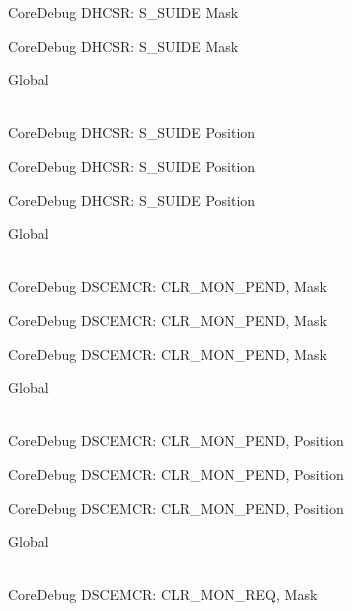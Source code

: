 \begin{DoxyRefList}
\label{deprecated__deprecated000467}%
%
Core\+Debug DHCSR\+: S\+\_\+\+SUIDE Mask 

\label{deprecated__deprecated000569}%
%
Core\+Debug DHCSR\+: S\+\_\+\+SUIDE Mask  
\item[{\parbox[t]{\linewidth}{Global \doxylink{group___c_m_s_i_s___s_c_b_gacff001d7e8c9665a1dc91018f2505d3d}{Core\+Debug\+\_\+\+DHCSR\+\_\+\+S\+\_\+\+SUIDE\+\_\+\+Pos} }}]\hfill \\
\label{deprecated__deprecated000015}%
%
Core\+Debug DHCSR\+: S\+\_\+\+SUIDE Position 

\label{deprecated__deprecated000466}%
%
Core\+Debug DHCSR\+: S\+\_\+\+SUIDE Position 

\label{deprecated__deprecated000568}%
%
Core\+Debug DHCSR\+: S\+\_\+\+SUIDE Position  
\item[{\parbox[t]{\linewidth}{Global \doxylink{group___c_m_s_i_s___s_c_b_gacfb17801664286ab627a094d5fb3da20}{Core\+Debug\+\_\+\+DSCEMCR\+\_\+\+CLR\+\_\+\+MON\+\_\+\+PEND\+\_\+\+Msk} }}]\hfill \\
\label{deprecated__deprecated000074}%
%
Core\+Debug DSCEMCR\+: CLR\+\_\+\+MON\+\_\+\+PEND, Mask 

\label{deprecated__deprecated000525}%
%
Core\+Debug DSCEMCR\+: CLR\+\_\+\+MON\+\_\+\+PEND, Mask 

\label{deprecated__deprecated000627}%
%
Core\+Debug DSCEMCR\+: CLR\+\_\+\+MON\+\_\+\+PEND, Mask  
\item[{\parbox[t]{\linewidth}{Global \doxylink{group___c_m_s_i_s___s_c_b_ga2295235d9c595bd6f287728f4c395bbf}{Core\+Debug\+\_\+\+DSCEMCR\+\_\+\+CLR\+\_\+\+MON\+\_\+\+PEND\+\_\+\+Pos} }}]\hfill \\
\label{deprecated__deprecated000073}%
%
Core\+Debug DSCEMCR\+: CLR\+\_\+\+MON\+\_\+\+PEND, Position 

\label{deprecated__deprecated000524}%
%
Core\+Debug DSCEMCR\+: CLR\+\_\+\+MON\+\_\+\+PEND, Position 

\label{deprecated__deprecated000626}%
%
Core\+Debug DSCEMCR\+: CLR\+\_\+\+MON\+\_\+\+PEND, Position  
\item[{\parbox[t]{\linewidth}{Global \doxylink{group___c_m_s_i_s___s_c_b_gaea36b8cede2cc1184176eb20b7bd0f8d}{Core\+Debug\+\_\+\+DSCEMCR\+\_\+\+CLR\+\_\+\+MON\+\_\+\+REQ\+\_\+\+Msk} }}]\hfill \\
\label{deprecated__deprecated000072}%
%
Core\+Debug DSCEMCR\+: CLR\+\_\+\+MON\+\_\+\+REQ, Mask 


\end{DoxyRefList}
